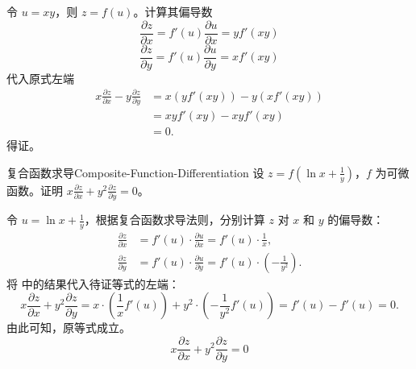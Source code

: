 \begin{myproof}
    令 $u = xy$，则 $z = f(u)$。计算其偏导数
    \begin{equation}
        \frac{\partial z}{\partial x} = f'(u) \frac{\partial u}{\partial x} = y f'(xy)
    \end{equation}
    \begin{equation}
        \frac{\partial z}{\partial y} = f'(u) \frac{\partial u}{\partial y} = x f'(xy)
    \end{equation}
    代入原式左端
    \begin{equation}
        \begin{aligned}
            x \frac{\partial z}{\partial x} - y \frac{\partial z}{\partial y} & = x (y f'(xy)) - y (x f'(xy)) \\
                                                                              & = xy f'(xy) - xy f'(xy)       \\
                                                                              & = 0.
        \end{aligned}
    \end{equation}
    得证。
\end{myproof}


\begin{problem}{复合函数求导}{Composite-Function-Differentiation}
    设 $z = f\left(\ln x + \frac{1}{y}\right)$，$f$ 为可微函数。证明 $x \frac{\partial z}{\partial x} + y^2 \frac{\partial z}{\partial y} = 0$。
\end{problem}

\begin{myproof}
    令 $u = \ln x + \frac{1}{y}$，根据复合函数求导法则，分别计算 $z$ 对 $x$ 和 $y$ 的偏导数：
    \begin{equation} \label{eq:z-partial}
        \begin{aligned}
            \frac{\partial z}{\partial x} & = f'(u) \cdot \frac{\partial u}{\partial x} = f'(u) \cdot \frac{1}{x},                   \\
            \frac{\partial z}{\partial y} & = f'(u) \cdot \frac{\partial u}{\partial y} = f'(u) \cdot \left( -\frac{1}{y^2} \right).
        \end{aligned}
    \end{equation}
    将  中的结果代入待证等式的左端：
    \begin{equation}
        x \frac{\partial z}{\partial x} + y^2 \frac{\partial z}{\partial y} = x \cdot \left( \frac{1}{x} f'(u) \right) + y^2 \cdot \left( -\frac{1}{y^2} f'(u) \right) = f'(u) - f'(u) = 0.
    \end{equation}
    由此可知，原等式成立。
    \begin{equation}
        \boxed{x \frac{\partial z}{\partial x} + y^2 \frac{\partial z}{\partial y} = 0}
    \end{equation}
\end{myproof}


